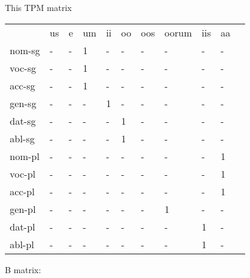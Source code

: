 \documentclass{article}
\begin{document}
 This TPM matrix  

\begin{tabular}{lllllllllll}\toprule
                &us      &e       &um      &ii      &oo      &oos     &oorum   &iis     &aa      \\ 
nom-sg     &    -   &    -   &     1  &    -   &    -   &    -   &    -   &    -   &    -   \\ 
voc-sg     &    -   &    -   &     1  &    -   &    -   &    -   &    -   &    -   &    -   \\ 
acc-sg     &    -   &    -   &     1  &    -   &    -   &    -   &    -   &    -   &    -   \\ 
gen-sg     &    -   &    -   &    -   &     1  &    -   &    -   &    -   &    -   &    -   \\ 
dat-sg     &    -   &    -   &    -   &    -   &     1  &    -   &    -   &    -   &    -   \\ 
abl-sg     &    -   &    -   &    -   &    -   &     1  &    -   &    -   &    -   &    -   \\ 
nom-pl     &    -   &    -   &    -   &    -   &    -   &    -   &    -   &    -   &     1  \\ 
voc-pl     &    -   &    -   &    -   &    -   &    -   &    -   &    -   &    -   &     1  \\ 
acc-pl     &    -   &    -   &    -   &    -   &    -   &    -   &    -   &    -   &     1  \\ 
gen-pl     &    -   &    -   &    -   &    -   &    -   &    -   &     1  &    -   &    -   \\ 
dat-pl     &    -   &    -   &    -   &    -   &    -   &    -   &    -   &     1  &    -   \\ 
abl-pl     &    -   &    -   &    -   &    -   &    -   &    -   &    -   &     1  &    -   \\ 
\end{tabular}


B matrix:
\end{document}
